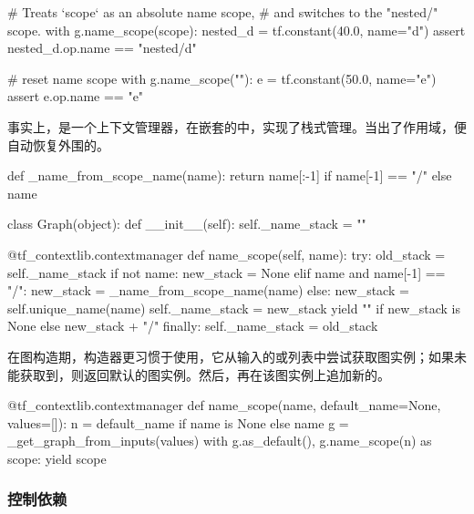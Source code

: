 \begin{content}
\begin{leftbar}
\begin{python}
      # Treats `scope` as an absolute name scope, 
      # and switches to the "nested/" scope.
      with g.name_scope(scope):
        nested_d = tf.constant(40.0, name="d")
        assert nested_d.op.name == "nested/d"

        # reset name scope
        with g.name_scope(""):
          e = tf.constant(50.0, name="e")
          assert e.op.name == "e"
\end{python}
\end{leftbar}

事实上，是一个上下文管理器，在嵌套的中，实现了栈式管理。当出了作用域，便自动恢复外围的。

\begin{leftbar}
\begin{python}
def _name_from_scope_name(name):
  return name[:-1] if name[-1] == "/" else name

class Graph(object):
  def __init__(self):
    self._name_stack = ""

  @tf_contextlib.contextmanager
  def name_scope(self, name):
    try:
      old_stack = self._name_stack
      if not name:
        new_stack = None
      elif name and name[-1] == "/":
        new_stack = _name_from_scope_name(name)
      else:
        new_stack = self.unique_name(name)
      self._name_stack = new_stack
      yield "" if new_stack is None else new_stack + "/"
    finally:
      self._name_stack = old_stack
\end{python}
\end{leftbar}

在图构造期，构造器更习惯于使用，它从输入的或列表中尝试获取图实例；如果未能获取到，则返回默认的图实例。然后，再在该图实例上追加新的。

\begin{leftbar}
\begin{python}
@tf_contextlib.contextmanager
def name_scope(name, default_name=None, values=[]):
  n = default_name if name is None else name
  g = _get_graph_from_inputs(values)
  with g.as_default(), g.name_scope(n) as scope:
    yield scope
\end{python}
\end{leftbar}

\subsubsection{控制依赖}


\end{content}
